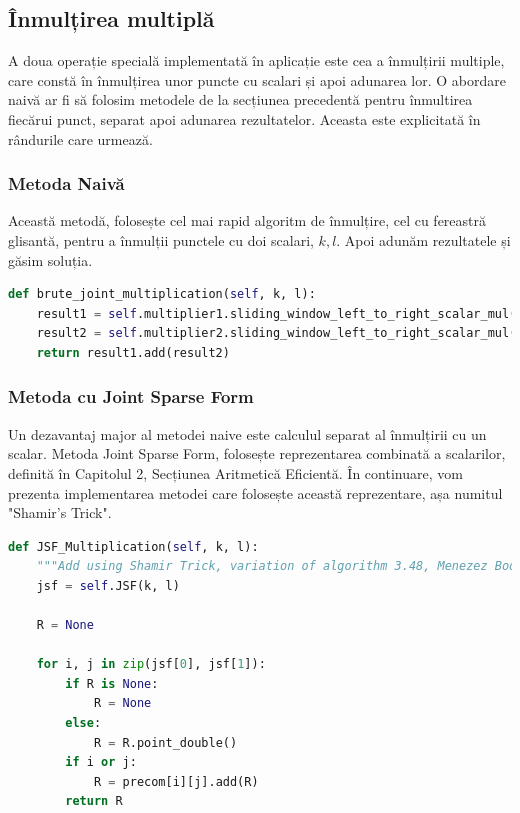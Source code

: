 \subsection{Înmulțirea multiplă}
\label{subsec:subsec04}

A doua operație specială implementată în aplicație este cea a înmulțirii multiple, care constă în înmulțirea unor puncte cu scalari și apoi adunarea lor. O abordare naivă ar fi să folosim metodele de la secțiunea precedentă pentru înmultirea fiecărui punct, separat apoi adunarea rezultatelor. Aceasta este explicitată în rândurile care urmează.

\subsubsection{Metoda Naivă}

Această metodă, folosește cel mai rapid algoritm de înmulțire, cel cu fereastră glisantă, pentru a înmulții punctele cu doi scalari, $k, l$. Apoi adunăm rezultatele și găsim soluția.  

\begin{lstlisting}[language=Python]
def brute_joint_multiplication(self, k, l):
    result1 = self.multiplier1.sliding_window_left_to_right_scalar_mul(k)
    result2 = self.multiplier2.sliding_window_left_to_right_scalar_mul(l)
    return result1.add(result2)
\end{lstlisting}

\subsubsection{Metoda cu Joint Sparse Form}

Un dezavantaj major al metodei naive este calculul separat al înmulțirii cu un scalar. Metoda Joint Sparse Form, folosește reprezentarea combinată a scalarilor, definită în Capitolul 2, Secțiunea Aritmetică Eficientă. În continuare, vom prezenta implementarea metodei care folosește această reprezentare, așa numitul "Shamir's Trick".

\begin{lstlisting}[language=Python]
def JSF_Multiplication(self, k, l):
    """Add using Shamir Trick, variation of algorithm 3.48, Menezez Book"""
    jsf = self.JSF(k, l)
    
    R = None

    for i, j in zip(jsf[0], jsf[1]):
        if R is None:
            R = None
        else:
            R = R.point_double()
        if i or j:
            R = precom[i][j].add(R)
        return R
\end{lstlisting}

